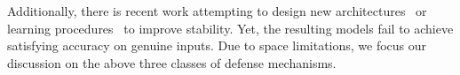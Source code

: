 Additionally, there is recent work attempting to design new \dnn architectures~\cite{Gu:2014:arxiv} or learning procedures~\cite{Chalupka:2014:arXiv} to improve \dnn stability. Yet, the resulting models fail to achieve satisfying accuracy on genuine inputs. Due to space limitations, we focus our discussion on the above three classes of defense mechanisms.
